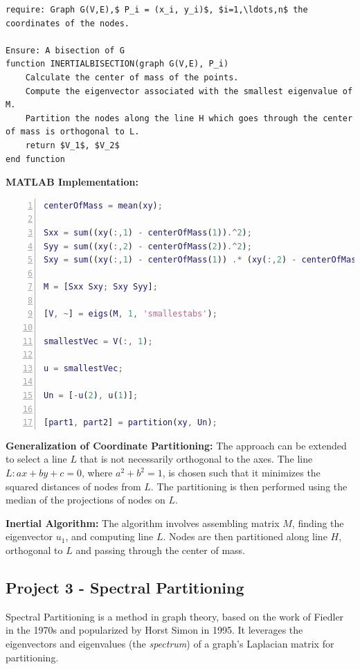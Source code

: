 \documentclass[unicode,11pt,a4paper,oneside,numbers=endperiod,openany]{scrartcl}
\begin{document}
\lstset{mathescape=true} %

\begin{lstlisting}
require: Graph G(V,E),$ P_i = (x_i, y_i)$, $i=1,\ldots,n$ the coordinates of the nodes.

Ensure: A bisection of G
function INERTIALBISECTION(graph G(V,E), P_i)
    Calculate the center of mass of the points.
    Compute the eigenvector associated with the smallest eigenvalue of M.
    Partition the nodes along the line H which goes through the center of mass is orthogonal to L.
    return $V_1$, $V_2$
end function
\end{lstlisting}



\textbf{MATLAB Implementation:}
\begin{lstlisting}[language=Matlab, numbers=left]
centerOfMass = mean(xy);

Sxx = sum((xy(:,1) - centerOfMass(1)).^2);
Syy = sum((xy(:,2) - centerOfMass(2)).^2);
Sxy = sum((xy(:,1) - centerOfMass(1)) .* (xy(:,2) - centerOfMass(2)));

M = [Sxx Sxy; Sxy Syy];

[V, ~] = eigs(M, 1, 'smallestabs');

smallestVec = V(:, 1);

u = smallestVec;

Un = [-u(2), u(1)];

[part1, part2] = partition(xy, Un);
\end{lstlisting}

\textbf{Generalization of Coordinate Partitioning:}
The approach can be extended to select a line \( L \) that is not necessarily orthogonal to the axes. The line \( L: ax + by + c = 0 \), where \( a^2 + b^2 = 1 \), is chosen such that it minimizes the squared distances of nodes from \( L \). The partitioning is then performed using the median of the projections of nodes on \( L \).

\textbf{Inertial Algorithm:}
The algorithm involves assembling matrix \( M \), finding the eigenvector \( u_1 \), and computing line \( L \). Nodes are then partitioned along line \( H \), orthogonal to \( L \) and passing through the center of mass.

\subsection{Project 3 -     Spectral Partitioning}

Spectral Partitioning is a method in graph theory, based on the work of Fiedler in the 1970s and popularized by Horst Simon in 1995. It leverages the eigenvectors and eigenvalues (the \textit{spectrum}) of a graph's Laplacian matrix for partitioning.
\end{document}
